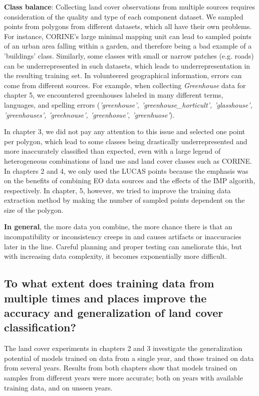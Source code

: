             \textbf{Class balance}: Collecting land cover observations from multiple sources requires consideration of the quality and type of each component dataset. We sampled points from polygons from different datasets, which all have their own problems. For instance, CORINE's large minimal mapping unit can lead to sampled points of an urban area falling within a garden, and therefore being a bad example of a 'buildings' class. Similarly, some classes with small or narrow patches (e.g. roads) can be underrepresented in such datasets, which leads to underrepresentation in the resulting training set. In volunteered geographical information, errors can come from different sources. For example, when collecting \textit{Greenhouse} data for chapter 5, we encountered greenhouses labeled in many different terms, languages, and spelling errors (\textit{'greenhouse', 'greenhouse\_horticult', 'glasshouse', 'greenhouses', 'greehnouse', 'greenhosue', 'greenhuose'}).

            In chapter 3, we did not pay any attention to this issue and selected one point per polygon, which lead to some classes being drastically underrepresented and more inaccurately classified than expected, even with a large legend of heterogeneous combinations of land use and land cover classes such as CORINE. In chapters 2 and 4, we only used the LUCAS points because the emphasis was on the benefits of combining EO data sources and the effects of the IMP algorith, respectively. In chapter, 5, however, we tried to improve the training data extraction method by making the number of sampled points dependent on the size of the polygon.

            \textbf{In general}, the more data you combine, the more chance there is that an incompatibility or inconsistency creeps in and causes artifacts or inaccuracies later in the line. Careful planning and proper testing can ameliorate this, but with increasing data complexity, it becomes exponentially more difficult.
            

    \subsection{To what extent does training data from multiple times and places improve the accuracy and generalization of land cover classification?}
    \label{syn:rq2}
    
        The land cover experiments in chapters 2 and 3 investigate the generalization potential of models trained on data from a single year, and those trained on data from several years. Results from both chapters show that models trained on samples from different years were more accurate; both on years with available training data, and on unseen years.
        
